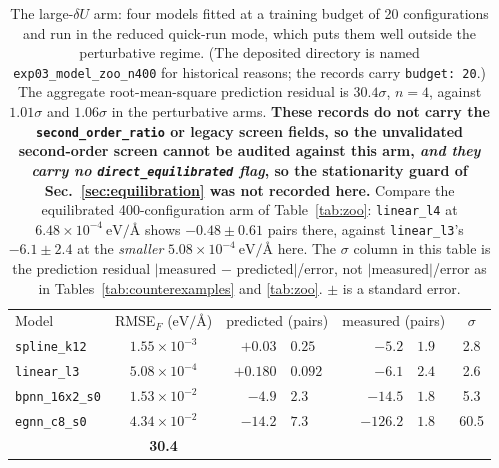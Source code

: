 \documentclass[aip,jcp,reprint,amsmath,amssymb,floatfix]{revtex4-2}
\newcommand{\dU}{\ensuremath{\delta U}}
\newcommand{\eVA}{\ensuremath{\mathrm{eV}/\text{\AA}}}
\begin{document}
\begin{table}[t]
\caption{\label{tab:breakdown}%
The large-$\dU$ arm: four models fitted at a training budget of 20
configurations and run in the reduced quick-run mode, which puts them well
outside the perturbative regime. (The deposited directory is named
\texttt{exp03\_model\_zoo\_n400} for historical reasons; the records carry
\texttt{budget: 20}.) The aggregate root-mean-square prediction
residual is $30.4\sigma$, $n = 4$, against $1.01\sigma$ and $1.06\sigma$ in the
perturbative arms. \textbf{These records do not carry the
\texttt{second\_order\_ratio} or legacy screen fields, so the
unvalidated second-order screen cannot be audited against this arm, \emph{and they
carry no \texttt{direct\_equilibrated} flag}, so the stationarity guard of
Sec.~\ref{sec:equilibration} was not recorded here.} Compare the equilibrated
400-configuration arm of Table~\ref{tab:zoo}: \texttt{linear\_l4} at
$6.48\times10^{-4}~\eVA$ shows $-0.48 \pm 0.61$ pairs there, against
\texttt{linear\_l3}'s $-6.1 \pm 2.4$ at the \emph{smaller}
$5.08\times10^{-4}~\eVA$ here. The $\sigma$ column in this table is the
prediction residual $|$measured $-$ predicted$|$/error, not $|$measured$|$/error
as in Tables~\ref{tab:counterexamples} and \ref{tab:zoo}. $\pm$ is a standard
error.}
\begin{ruledtabular}
\begin{tabular}{lcr@{\,$\pm$\,}lr@{\,$\pm$\,}lc}
Model & RMSE$_F$ ($\eVA$) & \multicolumn{2}{c}{predicted (pairs)} &
\multicolumn{2}{c}{measured (pairs)} & $\sigma$ \\
\colrule
\texttt{spline\_k12}    & $1.55\times10^{-3}$ & $+0.03$ & $0.25$ & $-5.2$ & $1.9$ & 2.8 \\
\texttt{linear\_l3}     & $5.08\times10^{-4}$ & $+0.180$ & $0.092$ & $-6.1$ & $2.4$ & 2.6 \\
\texttt{bpnn\_16x2\_s0} & $1.53\times10^{-2}$ & $-4.9$ & $2.3$ & $-14.5$ & $1.8$ & 5.3 \\
\texttt{egnn\_c8\_s0}   & $4.34\times10^{-2}$ & $-14.2$ & $7.3$ & $-126.2$ & $1.8$ & 60.5 \\
\colrule
\multicolumn{6}{l}{aggregate rms residual} & \textbf{30.4} \\
\end{tabular}
\end{ruledtabular}
\end{table}
\end{document}
